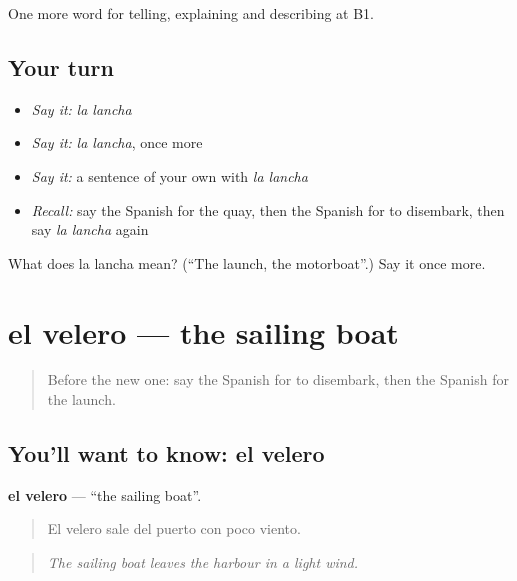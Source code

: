 \begin{grammarlens}[title={What you've built}]
One more word for telling, explaining and describing at B1.
\end{grammarlens}

\subsection*{Your turn}
\begin{itemize}
\raggedright
  \item \emph{Say it:} \emph{la lancha}
  \item \emph{Say it:} \emph{la lancha}, once more
  \item \emph{Say it:} a sentence of your own with \emph{la lancha}
  \item \emph{Recall:} say the Spanish for the quay, then the Spanish for to disembark, then say \emph{la lancha} again
\end{itemize}

\begin{tcolorbox}[breakable,colback=teal!4,colframe=teal!35!black,title={Before you move on}]
What does la lancha mean? (\textquotedblleft{}The launch, the motorboat\textquotedblright{}.) Say it once more.
\end{tcolorbox}
\section[el velero]{el velero — the sailing boat}

\label{lesson:ES-C659-velero}



\begin{quote}
Before the new one: say the Spanish for to disembark, then the Spanish for the launch.
\end{quote}

\subsection*{You'll want to know: el velero}
\textbf{el velero} — \textquotedblleft{}the sailing boat\textquotedblright{}.

\begin{quote}
El velero sale del puerto con poco viento.
\end{quote}

\begin{quote}
\emph{The sailing boat leaves the harbour in a light wind.}
\end{quote}

